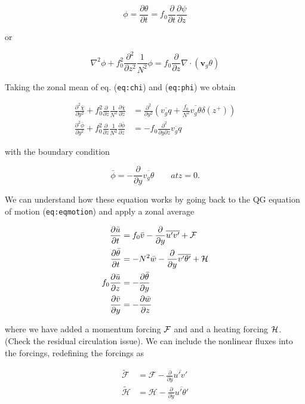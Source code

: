 \[\phi = \frac{\partial \theta}{\partial t} =f_0\frac{\partial }{\partial t}\frac{\partial \psi}{\partial z}\]

or

\[
\nabla^2\phi + f_0^2 \frac{\partial^{2}}{\partial z^{2}} \frac{1}{N^2} \phi = f_0\frac{\partial }{\partial z}\nabla\cdot(\mathbf{v}_g \theta)
\]

Taking the zonal mean of eq. (\texttt{eq:chi}) and (\texttt{eq:phi}) we
obtain

\[\begin{aligned}
\frac{\partial^{2} \bar{\chi}}{\partial y^{2}} + f_0^2 \frac{\partial }{\partial z} \frac{1}{N^2} \frac{\partial \bar{\chi}}{\partial z} &=\frac{\partial^{2} }{\partial y^2} \left( \overline{v_g q} + \frac{f_0}{N^2} \overline{v_g\theta} \delta(z^+) \right)  \\
\frac{\partial^{2} \bar{\phi}}{\partial y^{2}} +f_0^2 \frac{\partial }{\partial z} \frac{1}{N^2} \frac{\partial \bar{\phi}}{\partial z} &= -f_0 \frac{\partial^{2} }{\partial {y}\partial{z}} \overline{v_g q}
\end{aligned}\]

with the boundary condition

\[\bar{\phi}= -\frac{\partial }{\partial y}\overline{v_g\theta} \qquad  at z=0.\]

We can understand how these equation works by going back to the QG
equation of motion (\texttt{eq:eqmotion}) and apply a zonal average

\[\begin{aligned}
\frac{\partial \bar{u}}{\partial t} &= f_0 \bar{v}-\frac{\partial }{\partial y}\overline{u'v'} + \cal{F} \\
\frac{\partial \bar{\theta}}{\partial t} &= -N^2 \bar{w}-\frac{\partial }{\partial y}\overline{v'\theta'} + \cal{H} \\
f_0\frac{\partial \bar{u}}{\partial z} &= -\frac{\partial \bar{\theta}}{\partial y}\\
\frac{\partial \bar{v}}{\partial y} &= -\frac{\partial \bar{w}}{\partial z}
\end{aligned}\]

where we have added a momentum forcing \(\cal{F}\) and and a heating
forcing \(\cal{H}\). (Check the residual circulation issue). We can
include the nonlinear fluxes into the forcings, redefining the forcings
as

\[
\begin{aligned}
\widetilde{\mathcal{F}} &= \mathcal{F} -\frac{\partial}{\partial y} \overline{u'v'} \\
\widetilde{\mathcal{H}} &= \mathcal{H} -\frac{\partial }{\partial y} \overline{u'\theta'}
\end{aligned}
\]

